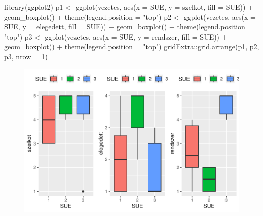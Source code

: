\documentclass[
  letterpaper,
]{krantz}
\makeatletter
\newenvironment{Shaded}{\begin{snugshade}}{\end{snugshade}}
\newcommand{\AttributeTok}[1]{\textcolor[rgb]{0.40,0.45,0.13}{#1}}
\newcommand{\DecValTok}[1]{\textcolor[rgb]{0.68,0.00,0.00}{#1}}
\newcommand{\FunctionTok}[1]{\textcolor[rgb]{0.28,0.35,0.67}{#1}}
\newcommand{\NormalTok}[1]{\textcolor[rgb]{0.00,0.23,0.31}{#1}}
\newcommand{\OtherTok}[1]{\textcolor[rgb]{0.00,0.23,0.31}{#1}}
\newcommand{\SpecialCharTok}[1]{\textcolor[rgb]{0.37,0.37,0.37}{#1}}
\newcommand{\StringTok}[1]{\textcolor[rgb]{0.13,0.47,0.30}{#1}}
\newenvironment{kframe}{%
\medskip{}
\setlength{\fboxsep}{.8em}
 \def\at@end@of@kframe{}%
 \ifinner\ifhmode%
  \def\at@end@of@kframe{\end{minipage}}%
  \begin{minipage}{\columnwidth}%
 \fi\fi%
 \def\FrameCommand##1{\hskip\@totalleftmargin \hskip-\fboxsep
 \colorbox{shadecolor}{##1}\hskip-\fboxsep
     \hskip-\linewidth \hskip-\@totalleftmargin \hskip\columnwidth}%
 \MakeFramed {\advance\hsize-\width
   \@totalleftmargin\z@ \linewidth\hsize
   \@setminipage}}%
 {\par\unskip\endMakeFramed%
 \at@end@of@kframe}
\renewenvironment{Shaded}{\begin{kframe}}{\end{kframe}}
\makeatother
\begin{document}
\begin{Shaded}
\begin{Highlighting}[]
\FunctionTok{library}\NormalTok{(ggplot2)}
\NormalTok{p1 }\OtherTok{\textless{}{-}} \FunctionTok{ggplot}\NormalTok{(vezetes, }\FunctionTok{aes}\NormalTok{(}\AttributeTok{x =}\NormalTok{ SUE, }\AttributeTok{y =}\NormalTok{ szelkot, }\AttributeTok{fill =}\NormalTok{ SUE)) }\SpecialCharTok{+}
    \FunctionTok{geom\_boxplot}\NormalTok{() }\SpecialCharTok{+} \FunctionTok{theme}\NormalTok{(}\AttributeTok{legend.position =} \StringTok{"top"}\NormalTok{)}
\NormalTok{p2 }\OtherTok{\textless{}{-}} \FunctionTok{ggplot}\NormalTok{(vezetes, }\FunctionTok{aes}\NormalTok{(}\AttributeTok{x =}\NormalTok{ SUE, }\AttributeTok{y =}\NormalTok{ elegedett, }\AttributeTok{fill =}\NormalTok{ SUE)) }\SpecialCharTok{+}
    \FunctionTok{geom\_boxplot}\NormalTok{() }\SpecialCharTok{+} \FunctionTok{theme}\NormalTok{(}\AttributeTok{legend.position =} \StringTok{"top"}\NormalTok{)}
\NormalTok{p3 }\OtherTok{\textless{}{-}} \FunctionTok{ggplot}\NormalTok{(vezetes, }\FunctionTok{aes}\NormalTok{(}\AttributeTok{x =}\NormalTok{ SUE, }\AttributeTok{y =}\NormalTok{ rendszer, }\AttributeTok{fill =}\NormalTok{ SUE)) }\SpecialCharTok{+}
    \FunctionTok{geom\_boxplot}\NormalTok{() }\SpecialCharTok{+} \FunctionTok{theme}\NormalTok{(}\AttributeTok{legend.position =} \StringTok{"top"}\NormalTok{)}
\NormalTok{gridExtra}\SpecialCharTok{::}\FunctionTok{grid.arrange}\NormalTok{(p1, p2, p3, }\AttributeTok{nrow =} \DecValTok{1}\NormalTok{)}
\end{Highlighting}
\end{Shaded}

\begin{figure}[H]

{\centering \includegraphics{./sec_tobbvaltozos_variancia_files/figure-pdf/unnamed-chunk-3-1.pdf}

}

\end{figure}
\end{document}
